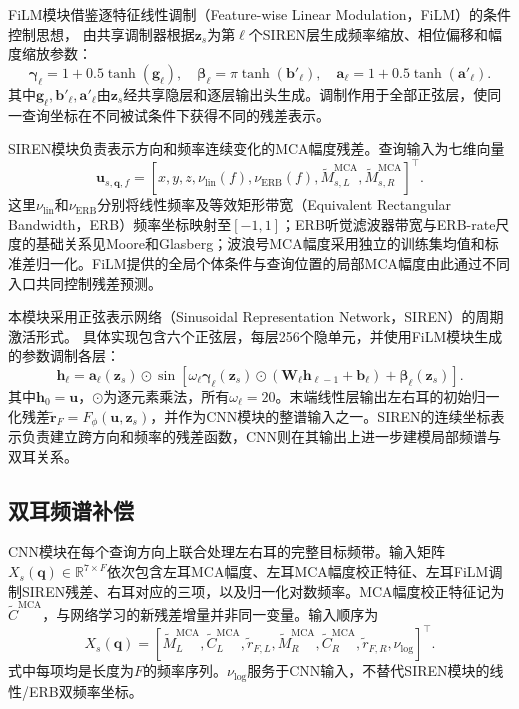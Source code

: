 \documentclass[UTF8,a4paper]{article}
\begin{document}
FiLM模块借鉴逐特征线性调制（Feature-wise Linear Modulation，FiLM）的条件控制思想\cite{R7}，
由共享调制器根据$\mathbf z_s$为第$\ell$个SIREN层生成频率缩放、相位偏移和幅度缩放参数：
\begin{equation}
\boldsymbol\gamma_\ell=1+0.5\tanh(\mathbf g_\ell),\quad
\boldsymbol\beta_\ell=\pi\tanh(\mathbf b'_\ell),\quad
\mathbf a_\ell=1+0.5\tanh(\mathbf a'_\ell).
\label{eq:film-modulation}
\end{equation}
其中$\mathbf g_\ell,\mathbf b'_\ell,\mathbf a'_\ell$由$\mathbf z_s$经共享隐层和逐层输出头生成。调制作用于全部正弦层，使同一查询坐标在不同被试条件下获得不同的残差表示。

SIREN模块负责表示方向和频率连续变化的MCA幅度残差。查询输入为七维向量
\begin{equation}
\mathbf u_{s,\mathbf q,f}=
[x,y,z,\nu_{\mathrm{lin}}(f),\nu_{\mathrm{ERB}}(f),
 \widetilde M^{\mathrm{MCA}}_{s,L},\widetilde M^{\mathrm{MCA}}_{s,R}]^\top .
\end{equation}
这里$\nu_{\mathrm{lin}}$和$\nu_{\mathrm{ERB}}$分别将线性频率及等效矩形带宽（Equivalent Rectangular Bandwidth，ERB）频率坐标映射至$[-1,1]$；ERB听觉滤波器带宽与ERB-rate尺度的基础关系见Moore和Glasberg\cite{R23}；波浪号MCA幅度采用独立的训练集均值和标准差归一化。FiLM提供的全局个体条件与查询位置的局部MCA幅度由此通过不同入口共同控制残差预测。

本模块采用正弦表示网络（Sinusoidal Representation Network，SIREN）的周期激活形式\cite{R11}。
具体实现包含六个正弦层，每层256个隐单元，并使用FiLM模块生成的参数调制各层：
\begin{equation}
\mathbf h_\ell=\mathbf a_\ell(\mathbf z_s)\odot
\sin\!\left[
\omega_\ell\boldsymbol\gamma_\ell(\mathbf z_s)\odot
(\mathbf W_\ell\mathbf h_{\ell-1}+\mathbf b_\ell)
+\boldsymbol\beta_\ell(\mathbf z_s)\right].
\label{eq:film-siren}
\end{equation}
其中$\mathbf h_0=\mathbf u$，$\odot$为逐元素乘法，所有$\omega_\ell=20$。末端线性层输出左右耳的初始归一化残差$\widetilde{\mathbf r}_F=F_\phi(\mathbf u,\mathbf z_s)$，并作为CNN模块的整谱输入之一。SIREN的连续坐标表示负责建立跨方向和频率的残差函数，CNN则在其输出上进一步建模局部频谱与双耳关系。

\subsection{双耳频谱补偿}
CNN模块在每个查询方向上联合处理左右耳的完整目标频带。输入矩阵$X_s(\mathbf q)\in\mathbb R^{7\times F}$依次包含左耳MCA幅度、左耳MCA幅度校正特征、左耳FiLM调制SIREN残差、右耳对应的三项，以及归一化对数频率。MCA幅度校正特征记为$\widetilde C^{\mathrm{MCA}}$，与网络学习的新残差增量并非同一变量。输入顺序为
\begin{equation}
X_s(\mathbf q)=
[\widetilde M_L^{\mathrm{MCA}},
 \widetilde C_L^{\mathrm{MCA}},\widetilde r_{F,L},
 \widetilde M_R^{\mathrm{MCA}},
 \widetilde C_R^{\mathrm{MCA}},\widetilde r_{F,R},
 \nu_{\log}]^\top .
\label{eq:cnn-input}
\end{equation}
式中每项均是长度为$F$的频率序列。$\nu_{\log}$服务于CNN输入，不替代SIREN模块的线性/ERB双频率坐标。
\end{document}
